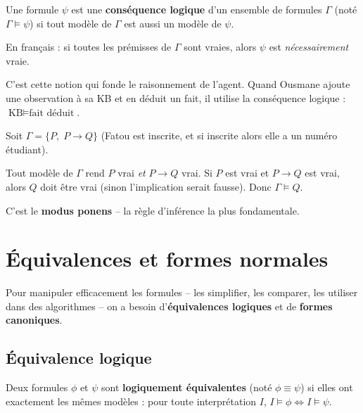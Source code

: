 \documentclass[11pt,a4paper]{article}
\begin{document}
\begin{definitionbox}
Une formule $\psi$ est une \textbf{conséquence logique} d'un ensemble de formules $\Gamma$ (noté $\Gamma \models \psi$) si tout modèle de $\Gamma$ est aussi un modèle de $\psi$.

En français : si toutes les prémisses de $\Gamma$ sont vraies, alors $\psi$ est \textit{nécessairement} vraie.
\end{definitionbox}

C'est cette notion qui fonde le raisonnement de l'agent. Quand Ousmane ajoute une observation à sa KB et en déduit un fait, il utilise la conséquence logique : $\text{KB} \models \text{fait déduit}$.

\begin{exemplebox}
Soit $\Gamma = \{P, \; P \rightarrow Q\}$ (Fatou est inscrite, et si inscrite alors elle a un numéro étudiant).

Tout modèle de $\Gamma$ rend $P$ vrai \textit{et} $P \rightarrow Q$ vrai. Si $P$ est vrai et $P \rightarrow Q$ est vrai, alors $Q$ doit être vrai (sinon l'implication serait fausse). Donc $\Gamma \models Q$.

C'est le \textbf{modus ponens} -- la règle d'inférence la plus fondamentale.
\end{exemplebox}

\section{Équivalences et formes normales}

Pour manipuler efficacement les formules -- les simplifier, les comparer, les utiliser dans des algorithmes -- on a besoin d'\textbf{équivalences logiques} et de \textbf{formes canoniques}.

\subsection{Équivalence logique}

\begin{definitionbox}
Deux formules $\phi$ et $\psi$ sont \textbf{logiquement équivalentes} (noté $\phi \equiv \psi$) si elles ont exactement les mêmes modèles : pour toute interprétation $I$, $I \models \phi \iff I \models \psi$.
\end{definitionbox}
\end{document}
